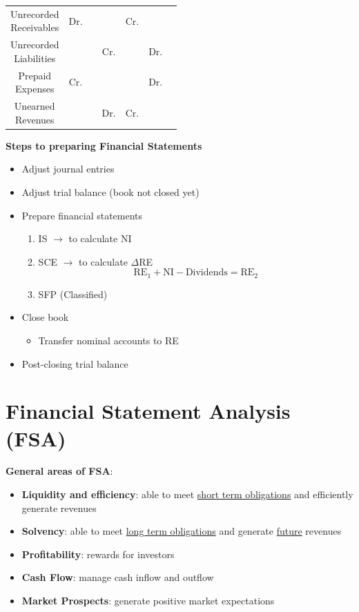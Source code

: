 \documentclass{article}
\begin{document}
\begin{multicols}{2}
\begin{table}[H]
{\begin{tabular}{c|c|c|c|ccc}
			\makecell{Unrecorded \\Receivables}&  Dr.&  &  & Cr. &  &  \\ \cline{1-2} \cline{4-7}
			\makecell{Unrecorded \\Liabilities}&  &  & Cr. &  & Dr. &  \\ \cline{1-2} \cline{4-7}
			\makecell{Prepaid\\Expenses}&  Cr.&  &  &  & Dr. &  \\ \cline{1-2} \cline{4-7}
			\makecell{Unearned\\Revenues}&  &  & Dr.  & Cr. &  &
		\end{tabular}
	}
\end{table}

\textbf{Steps to preparing Financial Statements}
\begin{itemize}
	\item Adjust journal entries
	\item Adjust trial balance (book not closed yet)
	\item Prepare financial statements
	\begin{enumerate}
		\item IS $\rightarrow$ to calculate NI
		\item SCE $\rightarrow$ to calculate $\Delta$RE
		$$\text{RE}_1 + \text{NI} - \text{Dividends} = \text{RE}_2$$
		\item SFP (Classified)
	\end{enumerate}
    \item Close book
    \begin{itemize}
    	\item Transfer nominal accounts to RE
    \end{itemize}
    \item Post-closing trial balance
\end{itemize}

\section{Financial Statement Analysis (FSA)}
\textbf{General areas of FSA}:
\begin{itemize}
	\item \textbf{Liquidity and efficiency}: able to meet \underline{short term obligations} and efficiently generate revenues
	\item \textbf{Solvency}: able to meet \underline{long term obligations} and generate \underline{future} revenues
	\item \textbf{Profitability}: rewards for investors
	\item \textbf{Cash Flow}: manage cash inflow and outflow
	\item \textbf{Market Prospects}: generate positive market expectations
\end{itemize}


\end{multicols}
\end{document}
